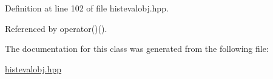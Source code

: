 \-Definition at line 102 of file histevalobj.\-hpp.



\-Referenced by operator()().



\-The documentation for this class was generated from the following file\-:\begin{DoxyCompactItemize}
\item 
\hyperlink{histevalobj_8hpp}{histevalobj.\-hpp}\end{DoxyCompactItemize}
